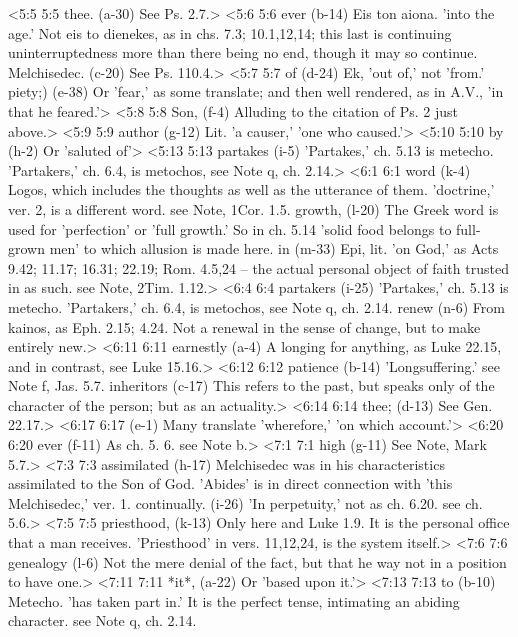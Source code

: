<5:5 5:5  thee. (a-30)  See Ps. 2.7.>
<5:6 5:6  ever (b-14)  Eis ton aiona. 'into the age.' Not eis to dienekes, as in  chs. 7.3; 10.1,12,14; this last is continuing uninterruptedness  more than there being no end, though it may so continue.
  Melchisedec. (c-20)  See Ps. 110.4.>
<5:7 5:7  of (d-24)  Ek, 'out of,' not 'from.'
  piety;) (e-38)  Or 'fear,' as some translate; and then well rendered, as in  A.V., 'in that he feared.'>
<5:8 5:8  Son, (f-4)  Alluding to the citation of Ps. 2 just above.>
<5:9 5:9  author (g-12)  Lit. 'a causer,' 'one who caused.'>
<5:10 5:10  by (h-2)  Or 'saluted of'>
<5:13 5:13  partakes (i-5)  'Partakes,' ch. 5.13 is metecho. 'Partakers,' ch. 6.4, is  metochos, see Note q, ch. 2.14.>
<6:1 6:1  word (k-4)  Logos, which includes the thoughts as well as the utterance  of them. 'doctrine,' ver. 2, is a different word. see Note, 1Cor. 1.5.
  growth, (l-20)  The Greek word is used for 'perfection' or 'full growth.' So  in ch. 5.14 'solid food belongs to full-grown men' to which  allusion is made here.
  in (m-33)  Epi, lit. 'on God,' as Acts 9.42; 11.17; 16.31; 22.19; Rom.  4.5,24 -- the actual personal object of faith trusted in as  such. see Note, 2Tim. 1.12.>
<6:4 6:4  partakers (i-25)  'Partakes,' ch. 5.13 is metecho. 'Partakers,' ch. 6.4, is  metochos, see Note q, ch. 2.14.
  renew (n-6)  From kainos, as Eph. 2.15; 4.24. Not a renewal in the sense  of change, but to make entirely new.>
<6:11 6:11  earnestly (a-4)  A longing for anything, as Luke 22.15, and in contrast, see  Luke 15.16.>
<6:12 6:12  patience (b-14)  'Longsuffering.' see Note f, Jas. 5.7.
  inheritors (c-17)  This refers to the past, but speaks only of the character of  the person; but as an actuality.>
<6:14 6:14  thee; (d-13)  See Gen. 22.17.>
<6:17 6:17   (e-1)  Many translate 'wherefore,' 'on which account.'>
<6:20 6:20  ever (f-11)  As ch. 5. 6. see Note b.>
<7:1 7:1  high (g-11)  See Note, Mark 5.7.>
<7:3 7:3  assimilated (h-17)  Melchisedec was in his characteristics assimilated to the Son  of God. 'Abides' is in direct connection with 'this  Melchisedec,' ver. 1.
  continually. (i-26)  'In perpetuity,' not as ch. 6.20. see ch. 5.6.>
<7:5 7:5  priesthood, (k-13)  Only here and Luke 1.9. It is the personal office that a man  receives. 'Priesthood' in vers. 11,12,24, is the system itself.>
<7:6 7:6  genealogy (l-6)  Not the mere denial of the fact, but that he way not in a  position to have one.>
<7:11 7:11  *it*, (a-22)  Or 'based upon it.'>
<7:13 7:13  to (b-10)  Metecho. 'has taken part in.' It is the perfect tense,  intimating an abiding character. see Note q, ch. 2.14.
